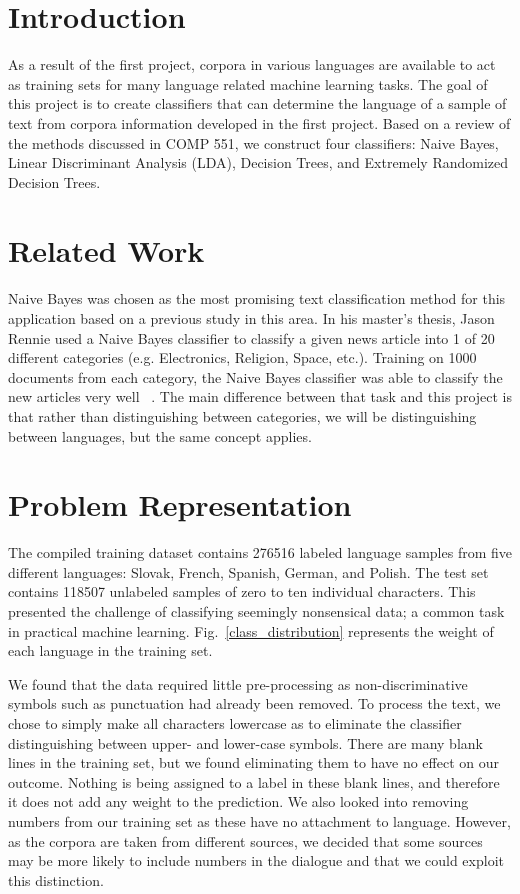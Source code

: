\documentclass[conference]{IEEEtran}
\begin{document}
\section{Introduction}
As a result of the first project, corpora in various languages are available to act as training sets for many language related machine learning tasks. The goal of this project is to create classifiers that can determine the language of a sample of text from corpora information developed in the first project. Based on a review of the methods discussed in COMP 551, we construct four classifiers: Naive Bayes, Linear Discriminant Analysis (LDA), Decision Trees, and Extremely Randomized Decision Trees.


\section{Related Work}
Naive Bayes was chosen as the most promising text classification method for this application based on a previous study in this area. In his master’s thesis, Jason Rennie used a Naive Bayes classifier to classify a given news article into 1 of 20 different categories (e.g. Electronics, Religion, Space, etc.). Training on 1000 documents from each category, the Naive Bayes classifier was able to classify the new articles very well ~\cite{Rennie}. The main difference between that task and this project is that rather than distinguishing between categories, we will be distinguishing between languages, but the same concept applies. 


\section{Problem Representation}
The compiled training dataset contains 276516 labeled language samples from five different languages: Slovak, French, Spanish, German, and Polish. The test set contains 118507 unlabeled samples of zero to ten individual characters. This presented the challenge of classifying seemingly nonsensical data; a common task in practical machine learning. Fig.~\ref{class_distribution} represents the weight of each language in the training set. 

We found that the data required little pre-processing as non-discriminative symbols such as punctuation had already been removed. To process the text, we chose to simply make all characters lowercase as to eliminate the classifier distinguishing between upper- and lower-case symbols. There are many blank lines in the training set, but we found eliminating them to have no effect on our outcome. Nothing is being assigned to a label in these blank lines, and therefore it does not add any weight to the prediction. We also looked into removing numbers from our training set as these have no attachment to language. However, as the corpora are taken from different sources, we decided that some sources may be more likely to include numbers in the dialogue and that we could exploit this distinction.
\end{document}
